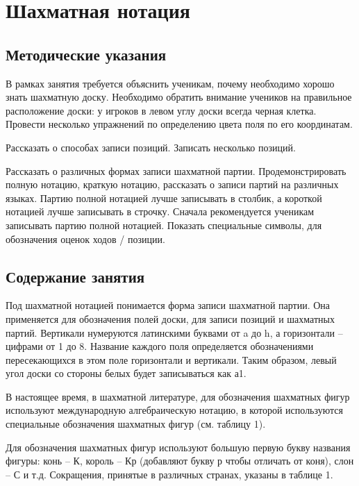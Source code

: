 \chapter{Шахматная нотация}

\section{Методические указания}

В рамках занятия требуется объяснить ученикам, почему необходимо хорошо знать шахматную доску. Необходимо обратить внимание учеников на правильное расположение доски: у игроков в левом углу доски всегда черная клетка. Провести несколько упражнений по определению цвета поля по его координатам.

Рассказать о способах записи позиций. Записать несколько позиций. 

Рассказать о различных формах записи шахматной партии. Продемонстрировать полную нотацию, краткую нотацию, рассказать о записи партий на различных языках. Партию полной нотацией лучше записывать в столбик, а короткой нотацией лучше записывать в строчку. Сначала рекомендуется ученикам записывать партию полной нотацией. Показать специальные символы, для обозначения оценок ходов / позиции.

\section{Содержание занятия}

Под шахматной нотацией понимается форма записи шахматной партии. Она применяется для обозначения полей доски, для записи позиций и шахматных партий. Вертикали нумеруются латинскими буквами от a до h, а горизонтали – цифрами от 1 до 8. Название каждого поля определяется обозначениями пересекающихся в этом поле горизонтали и вертикали. Таким образом, левый угол доски со стороны белых будет записываться как а1.

В настоящее время, в шахматной литературе, для обозначения шахматных фигур используют международную алгебраическую нотацию, в которой используются специальные обозначения шахматных фигур (см. таблицу 1). 

Для обозначения шахматных фигур используют большую первую букву названия фигуры: конь – К, король – Кр (добавляют букву р чтобы отличать от коня), слон – С и т.д. Сокращения, принятые в различных странах, указаны в таблице 1.


